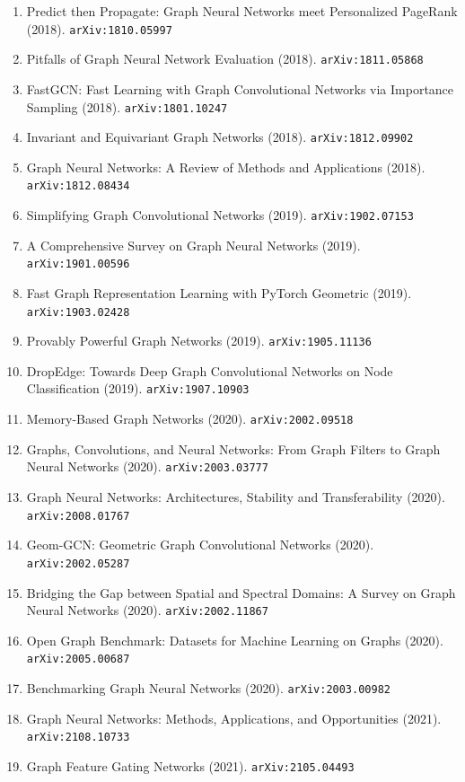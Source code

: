 \documentclass[11pt]{article}
\begin{document}
\begin{enumerate}
  \item Predict then Propagate: Graph Neural Networks meet Personalized PageRank (2018). \texttt{arXiv:1810.05997}
  \item Pitfalls of Graph Neural Network Evaluation (2018). \texttt{arXiv:1811.05868}
  \item FastGCN: Fast Learning with Graph Convolutional Networks via Importance
  Sampling (2018). \texttt{arXiv:1801.10247}
  \item Invariant and Equivariant Graph Networks (2018). \texttt{arXiv:1812.09902}
  \item Graph Neural Networks: A Review of Methods and Applications (2018). \texttt{arXiv:1812.08434}
  \item Simplifying Graph Convolutional Networks (2019). \texttt{arXiv:1902.07153}
  \item A Comprehensive Survey on Graph Neural Networks (2019). \texttt{arXiv:1901.00596}
  \item Fast Graph Representation Learning with PyTorch Geometric (2019). \texttt{arXiv:1903.02428}
  \item Provably Powerful Graph Networks (2019). \texttt{arXiv:1905.11136}
  \item DropEdge: Towards Deep Graph Convolutional Networks on Node
  Classification (2019). \texttt{arXiv:1907.10903}
  \item Memory-Based Graph Networks (2020). \texttt{arXiv:2002.09518}
  \item Graphs, Convolutions, and Neural Networks: From Graph Filters to Graph
  Neural Networks (2020). \texttt{arXiv:2003.03777}
  \item Graph Neural Networks: Architectures, Stability and Transferability (2020). \texttt{arXiv:2008.01767}
  \item Geom-GCN: Geometric Graph Convolutional Networks (2020). \texttt{arXiv:2002.05287}
  \item Bridging the Gap between Spatial and Spectral Domains: A Survey on Graph
  Neural Networks (2020). \texttt{arXiv:2002.11867}
  \item Open Graph Benchmark: Datasets for Machine Learning on Graphs (2020). \texttt{arXiv:2005.00687}
  \item Benchmarking Graph Neural Networks (2020). \texttt{arXiv:2003.00982}
  \item Graph Neural Networks: Methods, Applications, and Opportunities (2021). \texttt{arXiv:2108.10733}
  \item Graph Feature Gating Networks (2021). \texttt{arXiv:2105.04493}

\end{enumerate}
\end{document}
